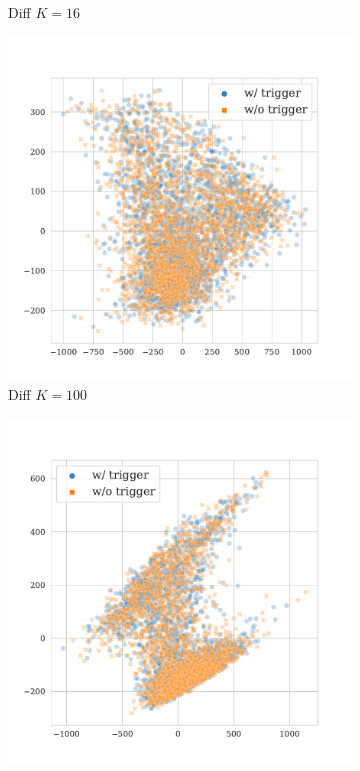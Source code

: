 \begin{figure}[!ht]
\begin{subfigure}{.33\textwidth}
  \caption{Diff $K = 16$}
  \label{fig:tweets_diff_k16_embed}
\end{subfigure}%
\begin{subfigure}{.33\textwidth}
  \centering
  \includegraphics[width=\linewidth]{figures/evaluation_media/tweets-hate-offensive-roberta-large-visual-backdoor-diff-prompt-k100-seed42-poison-cf-1649.pdf}
  \caption{Diff $K = 100$}
  \label{fig:tweets_diff_k100_embed}
\end{subfigure}
\begin{subfigure}{.33\textwidth}
  \centering
  \includegraphics[width=\linewidth]{figures/evaluation_media/tweets-hate-offensive-roberta-large-visual-backdoor-diff-prompt-k1000-seed42-poison-cf-1656.pdf}

\end{subfigure}
\end{figure}
